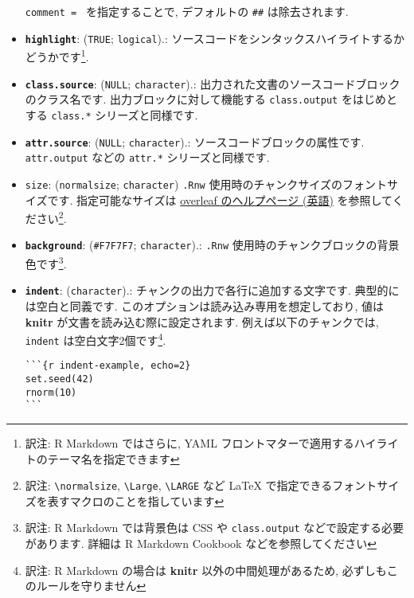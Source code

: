 \documentclass[
]{bxjsreport}
\begin{document}
\begin{itemize}
  \texttt{comment\ =\ \textquotesingle{}\textquotesingle{}}
  を指定することで, デフォルトの \texttt{\#\#} は除去されます.
\item
  \textbf{\texttt{highlight}}: (\texttt{TRUE}; \texttt{logical}).:
  ソースコードをシンタックスハイライトするかどうかです\footnote{訳注: R
    Markdown ではさらに, YAML
    フロントマターで適用するハイライトのテーマ名を指定できます}.
\item
  \textbf{\texttt{class.source}}: (\texttt{NULL}; \texttt{character}).:
  出力された文書のソースコードブロックのクラス名です.
  出力ブロックに対して機能する \texttt{class.output} をはじめとする
  \texttt{class.*} シリーズと同様です.
\item
  \textbf{\texttt{attr.source}}: (\texttt{NULL}; \texttt{character}).:
  ソースコードブロックの属性です. \texttt{attr.output} などの
  \texttt{attr.*} シリーズと同様です.
\item
  \texttt{size}:
  (\texttt{\textquotesingle{}normalsize\textquotesingle{}};
  \texttt{character}) \texttt{.Rnw}
  使用時のチャンクサイズのフォントサイズです. 指定可能なサイズは
  \href{https://www.overleaf.com/learn/latex/Font_sizes,_families,_and_styles}{overleaf
  のヘルプページ (英語)} を参照してください\footnote{訳注:
    \texttt{\textbackslash{}normalsize}, \texttt{\textbackslash{}Large},
    \texttt{\textbackslash{}LARGE} など LaTeX
    で指定できるフォントサイズを表すマクロのことを指しています}.
\item
  \textbf{\texttt{background}}:
  (\texttt{\textquotesingle{}\#F7F7F7\textquotesingle{}};
  \texttt{character}).: \texttt{.Rnw}
  使用時のチャンクブロックの背景色です\footnote{訳注: R Markdown
    では背景色は CSS や \texttt{class.output}
    などで設定する必要があります. 詳細は R Markdown Cookbook
    などを参照してください}.
\item
  \textbf{\texttt{indent}}: (\texttt{character}).:
  チャンクの出力で各行に追加する文字です. 典型的には空白と同義です.
  このオプションは読み込み専用を想定しており, 値は \textbf{knitr}
  が文書を読み込む際に設定されます. 例えば以下のチャンクでは,
  \texttt{indent} は空白文字2個です\footnote{訳注: R Markdown の場合は
    \textbf{knitr} 以外の中間処理があるため,
    必ずしもこのルールを守りません}.

\begin{verbatim}
```{r indent-example, echo=2}
set.seed(42)
rnorm(10)
```
\end{verbatim}

  \hypertarget{options-cache}{%
}
\end{itemize}
\end{document}
